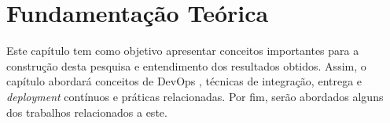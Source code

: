 \chapter{Fundamentação Teórica}

Este capítulo tem como objetivo apresentar conceitos importantes para a
construção desta pesquisa e entendimento dos resultados obtidos. Assim, o capítulo abordará conceitos de DevOps \cite{devopsWiki}, técnicas de integração, entrega e \emph{deployment} contínuos \cite{fowlerCI, fowlerCD} e práticas relacionadas. Por fim, serão abordados alguns dos trabalhos relacionados a este.




    


